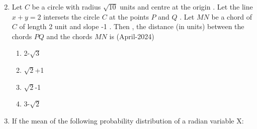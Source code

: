 \documentclass[journal,12pt,onecolumn]{IEEEtran}
\theoremstyle{remark}
\begin{document}
\begin{enumerate}
\begin{multicols}{2}
\begin{enumerate}
\end{enumerate}
\end{multicols}
\item Let $C$ be a circle with radius $\sqrt{10}$ units and centre at the origin . Let the line $x+y=2$ intersets the circle $C$ at the points $P$ and $Q$ . Let $MN$ be a chord of $C$ of length 2 unit and slope -1 . Then , the distance (in units) between the chords $PQ$ and the chords $MN$ is
\hfill{(April-2024)}
\begin{multicols}{2}
\begin{enumerate}
\item 2-$\sqrt{3}$
\item $\sqrt{2}$+1 
\item $\sqrt{2}$-1
\item 3-$\sqrt{2}$
\end{enumerate}
\end{multicols}
\item If the mean of the following probability distribution of a radian variable X:\\


\end{enumerate}
\end{document}
